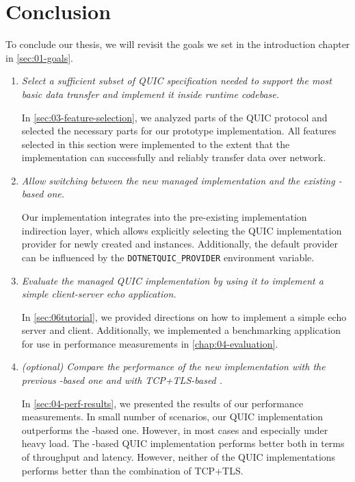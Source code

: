 \chapter*{Conclusion}

To conclude our thesis, we will revisit the goals we set in the introduction chapter in
\autoref{sec:01-goals}.

\begin{enumerate}

  \item \textit{Select a sufficient subset of QUIC specification needed to support the most basic data
        transfer and implement it inside \dotnet{} runtime codebase.}

        In \autoref{sec:03-feature-selection}, we analyzed parts of the QUIC protocol and selected
        the necessary parts for our prototype implementation. All features selected in this section
        were implemented to the extent that the implementation can successfully and reliably
        transfer data over network.

  \item \textit{Allow switching between the new managed implementation and the existing \libmsquic{}-based one.}

        Our implementation integrates into the pre-existing implementation indirection layer, which
        allows explicitly selecting the QUIC implementation provider for newly created
        \QuicListener{} and \QuicConnection{} instances. Additionally, the default provider can be
        influenced by the \texttt{DOTNETQUIC_PROVIDER} environment variable.

  \item \textit{Evaluate the managed QUIC implementation by using it to implement a simple client-server
echo application.}

        In \autoref{sec:06tutorial}, we provided directions on how to implement a simple echo
        server and client. Additionally, we implemented a benchmarking application for use in
        performance measurements in \autoref{chap:04-evaluation}.

  \item \textit{(optional) Compare the performance of the new implementation with the
previous \libmsquic{}-based one and with TCP+TLS-based .}

        In \autoref{sec:04-perf-results}, we presented the results of our performance measurements.
        In small number of scenarios, our QUIC implementation outperforms the \libmsquic{}-based
        one. However, in most cases and especially under heavy load. The \libmsquic{}-based QUIC
        implementation performs better both in terms of throughput and latency. However, neither of
        the QUIC implementations performs better than the combination of TCP+TLS\@.

\end{enumerate}

